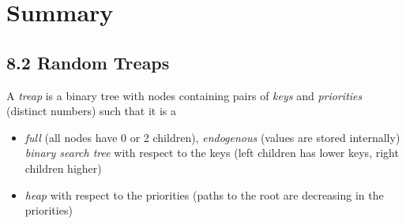 \section*{Summary}

\subsection*{8.2 Random Treaps}

\begin{definition}
A \emph{treap} is a binary tree with nodes containing pairs of \emph{keys} and \emph{priorities} (distinct numbers) such that it is a
\begin{itemize}
  \item \emph{full} (all nodes have 0 or 2 children), \emph{endogenous} (values are stored internally) \emph{binary search tree} with respect to the keys (left children has lower keys, right children higher)
  \item \emph{heap} with respect to the priorities (paths to the root are decreasing in the priorities)
\end{itemize}
\end{definition}


